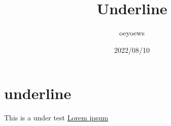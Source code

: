 \documentclass{article}
\title{Underline}
\author{oeyoews}
\date{2022/08/10}
\begin{document}
\maketitle

\section{underline}%

\begin{center}
  This is a under test
\underline{ Lorem ipsum }
\end{center}
\end{document}
